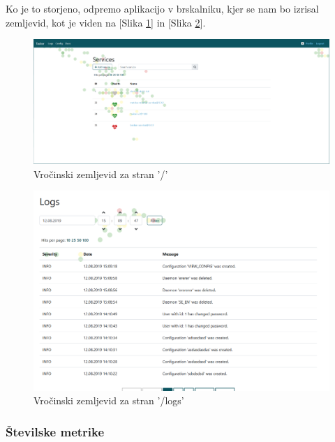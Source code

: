 \documentclass[a4paper, 12pt]{book}
\begin{document}
Ko je to storjeno, odpremo aplikacijo v brskalniku, kjer se nam bo izrisal zemljevid, kot je viden na [Slika \ref{img:heatmap1}] in [Slika \ref{img:heatmap2}].

\begin{figure}[h]
	\begin{center}
		\includegraphics[width=1\textwidth]{heatmap_1.png}
	\end{center}
	\caption{Vročinski zemljevid za stran '/'}
	\label{img:heatmap1}
\end{figure}

\begin{figure}[h]
	\begin{center}
		\includegraphics[width=1\textwidth]{heatmap_2.png}
	\end{center}
	\caption{Vročinski zemljevid  za stran '/logs'}
	\label{img:heatmap2}
\end{figure}

\subsubsection{Številske metrike}
\end{document}

